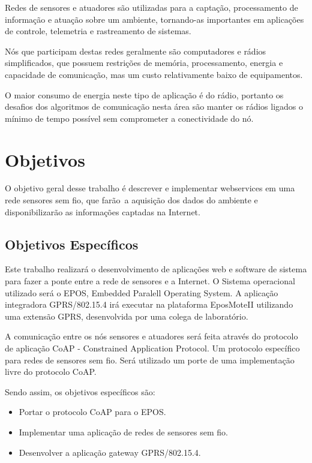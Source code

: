 Redes de sensores e atuadores s\~ao utilizadas para a capta\c{c}\~ao, processamento de informa\c{c}\~ao e atua\c{c}\~ao sobre um ambiente, tornando-as importantes em aplica\c{c}\~oes de controle, telemetria e rastreamento de sistemas.

N\'os que participam destas redes geralmente s\~ao computadores e r\'adios simplificados, que possuem restri\c{c}\~oes de mem\'oria, processamento, energia e capacidade de comunica\c{c}\~ao, mas um custo relativamente baixo de equipamentos.

O maior consumo de energia neste tipo de aplica\c{c}\~ao \'e do r\'adio, portanto os desafios dos algoritmos de comunica\c{c}\~ao nesta \'area s\~ao manter os r\'adios ligados o m\'inimo de tempo poss\'ivel sem comprometer a conectividade do n\'o.

\section{Objetivos}
O objetivo geral desse trabalho \'e descrever e implementar webservices em uma rede sensores sem fio, que far\~ao\
a aquisi\c{c}\~ao dos dados do ambiente e disponibilizar\~ao as informa\c{c}\~oes captadas na Internet.

\subsection{Objetivos Espec\'ificos}
Este trabalho realizar\'a o desenvolvimento de aplica\c{c}\~oes web e software de sistema para fazer a ponte entre a rede de sensores e a Internet. O Sistema operacional utilizado ser\'a o EPOS, Embedded Paralell Operating System. A aplica\c{c}\~ao integradora GPRS/802.15.4 ir\'a executar na plataforma EposMoteII utilizando uma extens\~ao GPRS, desenvolvida por uma colega de laborat\'orio.

A comunica\c{c}\~ao entre os n\'os sensores e atuadores ser\'a feita atrav\'es do protocolo de aplica\c{c}\~ao CoAP - Constrained Application Protocol. Um protocolo espec\'ifico para redes de sensores sem fio. Ser\'a utilizado um porte de uma implementa\c{c}\~ao livre do protocolo CoAP.

Sendo assim, os objetivos espec\'ificos s\~ao:

\begin{itemize}
\item Portar o protocolo CoAP para o EPOS.
\item Implementar uma aplica\c{c}\~ao de redes de sensores sem fio.
\item Desenvolver a aplica\c{c}\~ao gateway GPRS/802.15.4.
\end{itemize}

